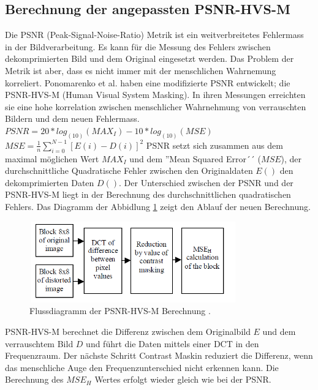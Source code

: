 \subsection{Berechnung der angepassten PSNR-HVS-M}\label{testsetup:psnr}
Die PSNR (Peak-Signal-Noise-Ratio) Metrik ist ein weitverbreitetes Fehlermass in der Bildverarbeitung. Es kann für die Messung des Fehlers zwischen dekomprimierten Bild und dem Original eingesetzt werden. Das Problem der Metrik ist aber, dass es nicht immer mit der menschlichen Wahrnemung korreliert. Ponomarenko et al.  \cite{ponomarenko2007between:psnr} haben eine modifizierte PSNR entwickelt; die PSNR-HVS-M (Human Visual System Masking). In ihren Messungen erreichten sie eine hohe korrelation zwischen menschlicher Wahrnehmung von  verrauschten Bildern und dem neuen Fehlermass.\\
[\baselineskip]
$PSNR = 20 * log_(10)(MAX_I) - 10*log_(10)(MSE)$
$MSE = \frac{1}{n}\sum_{i=0}^{N-1}[E(i)-D(i)]^2$
PSNR setzt sich zusammen aus dem maximal möglichen Wert $MAX_I$ und dem ''Mean Squared Error´´ ($MSE$), der durchschnittliche Quadratische Fehler zwischen den Originaldaten $E()$ den dekomprimierten Daten $D()$.
Der Unterschied zwischen der PSNR und der PSNR-HVS-M liegt in der Berechnung des durchschnittlichen quadratischen Fehlers. Das Diagramm der Abbidlung \ref{testsetup:ablauf:psnr:flowchart} zeigt den Ablauf der neuen Berechnung.\\
\begin{figure}[!htbp]
	\center
	\includegraphics[width=0.8\textwidth,height=3.5cm,keepaspectratio]{./pictures/testsetup/psnr-hvs-m-flow.png}
	\caption{Flussdiagramm der PSNR-HVS-M Berechnung \cite{ponomarenko2007between:psnr}.}
	\label{testsetup:ablauf:psnr:flowchart}
\end{figure}
PSNR-HVS-M berechnet die Differenz zwischen dem Originalbild $E$ und dem verrauschtem Bild $D$ und führt die Daten mittels einer DCT in den Frequenzraum. Der nächste Schritt Contrast Maskin reduziert die Differenz, wenn das menschliche Auge den Frequenzunterschied nicht erkennen kann. Die Berechnung des $MSE_H$ Wertes erfolgt wieder gleich wie bei der PSNR.

